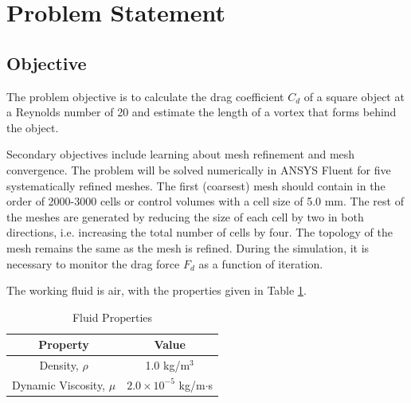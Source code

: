 \section{Problem Statement}

\subsection{Objective}
The problem objective is to calculate the drag coefficient $C_d$ of a square object at a Reynolds number of 20 and estimate the length of a vortex that forms behind the object. 

Secondary objectives include learning about mesh refinement and mesh convergence. The problem will be solved numerically in ANSYS Fluent for five systematically refined meshes. The first (coarsest) mesh should contain in the order of 2000-3000 cells or control volumes with a cell size of 5.0 mm. The rest of the meshes are generated by reducing the size of each cell by two in both directions, i.e. increasing the total number of cells by four. The topology of the mesh remains the same as the mesh is refined. During the simulation, it is necessary to monitor the drag force $F_d$ as a function of iteration.

The working fluid is air, with the properties given in Table \ref{tab:fluid_properties}.
\begin{table}[H]
    \centering
    \caption{Fluid Properties}
    \label{tab:fluid_properties}
    \begin{tabular}{cc}
        \toprule
        Property & Value \\
        \midrule
        Density, $\rho$ & 1.0 kg/m$^3$ \\
        Dynamic Viscosity, $\mu$ & $2.0 \times 10^{-5}$ kg/m$\cdot$s \\
        \bottomrule
    \end{tabular}
\end{table}
